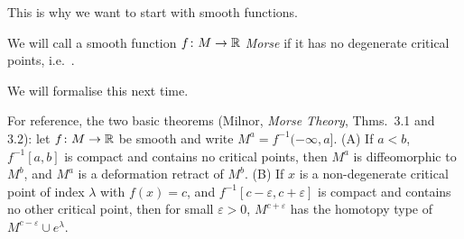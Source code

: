 This is why we want to start with smooth functions.

\begin{definition}
\label{L07:def:morse}
We will call a smooth function $f\colon M\to\mathbb{R}$ \emph{Morse} if it has no degenerate
critical points, i.e.\ .
\end{definition}

We will formalise this next time.

\begin{addedblock}
For reference, the two basic theorems (Milnor, \emph{Morse Theory}, Thms.~3.1 and 3.2):
let $f\colon M\to\mathbb{R}$ be smooth and write $M^a=f^{-1}(-\infty,a]$.
(A) If $a<b$, $f^{-1}[a,b]$ is compact and contains no critical points, then $M^a$ is
diffeomorphic to $M^b$, and $M^a$ is a deformation retract of $M^b$.
(B) If $x$ is a non-degenerate critical point of index $\lambda$ with $f(x)=c$, and
$f^{-1}[c-\varepsilon,c+\varepsilon]$ is compact and contains no other critical point, then
for small $\varepsilon>0$, $M^{c+\varepsilon}$ has the homotopy type of
$M^{c-\varepsilon}\cup e^{\lambda}$.
\end{addedblock}
